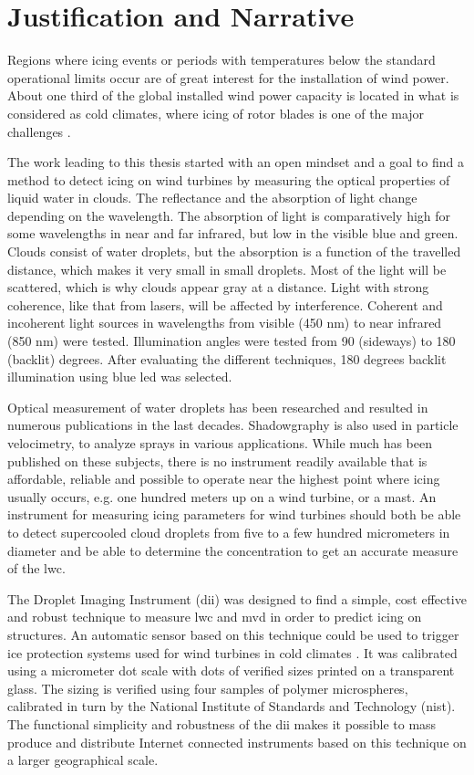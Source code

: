 \section{Justification and Narrative}

Regions where icing events or periods with temperatures below the standard operational limits occur are of great interest for the installation of wind power. About one third of the global installed wind power capacity is located in what is considered as cold climates, where icing of rotor blades is one of the major challenges \cite{iea2017}.

The work leading to this thesis started with an open mindset and a goal to find a method to detect icing on wind turbines by measuring the optical properties of liquid water in clouds. The reflectance and the absorption of light change depending on the wavelength. The absorption of light is comparatively high for some wavelengths in near and far infrared, but low in the visible blue and green. Clouds consist of water droplets, but the absorption is a function of the travelled distance, which makes it very small in small droplets. Most of the light will be scattered, which is why clouds appear gray at a distance. Light with strong coherence, like that from lasers, will be affected by interference. Coherent and incoherent light sources in wavelengths from visible (450 nm) to near infrared (850 nm) were tested. Illumination angles were tested from 90 (sideways) to 180 (backlit) degrees. After evaluating the different techniques, 180 degrees backlit illumination using blue \gls{led} was selected.

Optical measurement of water droplets has been researched and resulted in numerous publications in the last decades. Shadowgraphy is also used in particle velocimetry, to analyze sprays in various applications. While much has been published on these subjects, there is no instrument readily available that is affordable, reliable and possible to operate near the highest point where icing usually occurs, e.g. one hundred meters up on a wind turbine, or a mast. An instrument for measuring icing parameters for wind turbines should both be able to detect supercooled cloud droplets from five to a few hundred micrometers in diameter and be able to determine the concentration to get an accurate measure of the \gls{lwc}.

The Droplet Imaging Instrument (\gls{dii}) was designed to find a simple, cost effective and robust technique to measure \gls{lwc} and \gls{mvd} in order to predict icing on structures. An automatic sensor based on this technique could be used to trigger ice protection systems used for wind turbines in cold climates \cite{lamra2013}. It was calibrated using a micrometer dot scale with dots of verified sizes printed on a transparent glass. The sizing is verified using four samples of polymer microspheres, calibrated in turn by the National Institute of Standards and Technology (\gls{nist}). The functional simplicity and robustness of the \gls{dii} makes it possible to mass produce and distribute Internet connected instruments based on this technique on a larger geographical scale.

